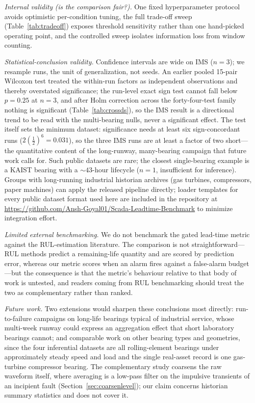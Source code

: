 \documentclass[IJPHM, 2026, 0]{PHMSociety}
\begin{document}
\emph{Internal validity (is the comparison fair?).} One fixed hyperparameter protocol avoids optimistic per-condition tuning, the full trade-off sweep (Table~\ref{tab:tradeoff}) exposes threshold sensitivity rather than one hand-picked operating point, and the controlled sweep isolates information loss from window counting.

\emph{Statistical-conclusion validity.} Confidence intervals are wide on IMS ($n=3$); we resample runs, the unit of generalization, not seeds. An earlier pooled 15-pair Wilcoxon test treated the within-run factors as independent observations and thereby overstated significance; the run-level exact sign test cannot fall below $p=0.25$ at $n=3$, and after Holm correction across the forty-four-test family nothing is significant (Table~\ref{tab:crossds}), so the IMS result is a directional trend to be read with the multi-bearing nulls, never a significant effect. The test itself sets the minimum dataset: significance needs at least six sign-concordant runs ($2(\tfrac{1}{2})^6=0.031$), so the three IMS runs are at least a factor of two short---the quantitative content of the long-runway, many-bearing campaign that future work calls for. Such public datasets are rare; the closest single-bearing example is a KAIST bearing with a ${\sim}43$-hour lifecycle ($n=1$, insufficient for inference). Groups with long-running industrial historian archives (gas turbines, compressors, paper machines) can apply the released pipeline directly; loader templates for every public dataset format used here are included in the repository at \url{https://github.com/Ansh-Goyal01/Scada-Leadtime-Benchmark} to minimize integration effort.

\emph{Limited external benchmarking.} We do not benchmark the gated lead-time metric against the RUL-estimation literature. The comparison is not straightforward---RUL methods predict a remaining-life quantity and are scored by prediction error, whereas our metric scores when an alarm fires against a false-alarm budget---but the consequence is that the metric's behaviour relative to that body of work is untested, and readers coming from RUL benchmarking should treat the two as complementary rather than ranked.

\emph{Future work.} Two extensions would sharpen these conclusions most directly: run-to-failure campaigns on long-life bearings typical of industrial service, whose multi-week runway could express an aggregation effect that short laboratory bearings cannot; and comparable work on other bearing types and geometries, since the four inferential datasets are all rolling-element bearings under approximately steady speed and load and the single real-asset record is one gas-turbine compressor bearing. The complementary study coarsens the raw waveform itself, where averaging is a low-pass filter on the impulsive transients of an incipient fault (Section~\ref{sec:coarsenlevel}); our claim concerns historian summary statistics and does not cover it.
\end{document}
